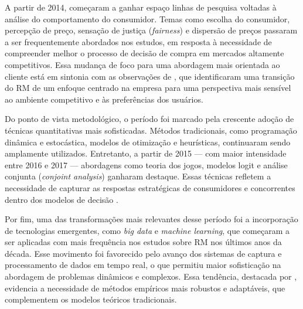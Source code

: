 A partir de 2014, começaram a ganhar espaço linhas de pesquisa voltadas à análise do comportamento do consumidor. Temas como escolha do consumidor, percepção de preço, sensação de justiça (\textit{fairness}) e dispersão de preços passaram a ser frequentemente abordados nos estudos, em resposta à necessidade de compreender melhor o processo de decisão de compra em mercados altamente competitivos. Essa mudança de foco para uma abordagem mais orientada ao cliente está em sintonia com as observações de \citet{Noone2011}, que identificaram uma transição do RM de um enfoque centrado na empresa para uma perspectiva mais sensível ao ambiente competitivo e às preferências dos usuários.

Do ponto de vista metodológico, o período foi marcado pela crescente adoção de técnicas quantitativas mais sofisticadas. Métodos tradicionais, como programação dinâmica e estocástica, modelos de otimização e heurísticas, continuaram sendo amplamente utilizados. Entretanto, a partir de 2015 — com maior intensidade entre 2016 e 2017 — abordagens como teoria dos jogos, modelos logit e análise conjunta (\textit{conjoint analysis}) ganharam destaque. Essas técnicas refletem a necessidade de capturar as respostas estratégicas de consumidores e concorrentes dentro dos modelos de decisão \citep{Mulyani2021TheFH, Shen2007,STRAUSS2018375}.

Por fim, uma das transformações mais relevantes desse período foi a incorporação de tecnologias emergentes, como \textit{big data} e \textit{machine learning}, que começaram a ser aplicadas com mais frequência nos estudos sobre RM nos últimos anos da década. Esse movimento foi favorecido pelo avanço dos sistemas de captura e processamento de dados em tempo real, o que permitiu maior sofisticação na abordagem de problemas dinâmicos e complexos. Essa tendência, destacada por \citet{Gönsch2013}, evidencia a necessidade de métodos empíricos mais robustos e adaptáveis, que complementem os modelos teóricos tradicionais.




